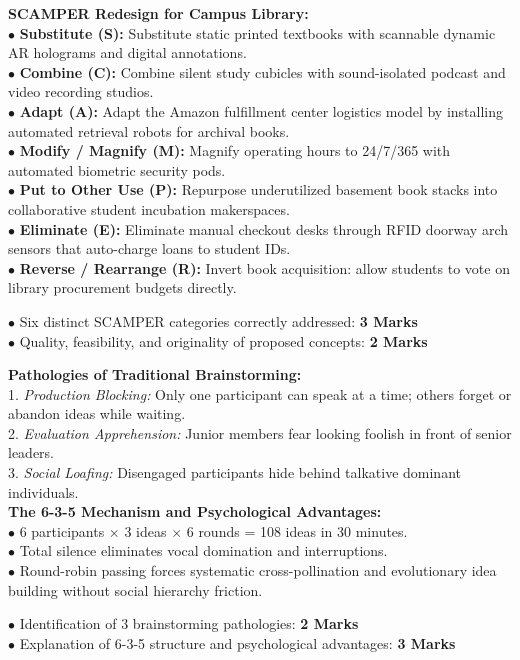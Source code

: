 \begin{solutionbox}
\textbf{SCAMPER Redesign for Campus Library:}\\
$\bullet$ \textbf{Substitute (S):} Substitute static printed textbooks with scannable dynamic AR holograms and digital annotations.\\
$\bullet$ \textbf{Combine (C):} Combine silent study cubicles with sound-isolated podcast and video recording studios.\\
$\bullet$ \textbf{Adapt (A):} Adapt the Amazon fulfillment center logistics model by installing automated retrieval robots for archival books.\\
$\bullet$ \textbf{Modify / Magnify (M):} Magnify operating hours to 24/7/365 with automated biometric security pods.\\
$\bullet$ \textbf{Put to Other Use (P):} Repurpose underutilized basement book stacks into collaborative student incubation makerspaces.\\
$\bullet$ \textbf{Eliminate (E):} Eliminate manual checkout desks through RFID doorway arch sensors that auto-charge loans to student IDs.\\
$\bullet$ \textbf{Reverse / Rearrange (R):} Invert book acquisition: allow students to vote on library procurement budgets directly.
\begin{markingrubric}
$\bullet$ Six distinct SCAMPER categories correctly addressed: \textbf{3 Marks}\\
$\bullet$ Quality, feasibility, and originality of proposed concepts: \textbf{2 Marks}
\end{markingrubric}
\end{solutionbox}

\begin{solutionbox}
\textbf{Pathologies of Traditional Brainstorming:}\\
1. \textit{Production Blocking:} Only one participant can speak at a time; others forget or abandon ideas while waiting.\\
2. \textit{Evaluation Apprehension:} Junior members fear looking foolish in front of senior leaders.\\
3. \textit{Social Loafing:} Disengaged participants hide behind talkative dominant individuals.\\
\textbf{The 6-3-5 Mechanism and Psychological Advantages:}\\
$\bullet$ 6 participants $\times$ 3 ideas $\times$ 6 rounds = 108 ideas in 30 minutes.\\
$\bullet$ Total silence eliminates vocal domination and interruptions.\\
$\bullet$ Round-robin passing forces systematic cross-pollination and evolutionary idea building without social hierarchy friction.
\begin{markingrubric}
$\bullet$ Identification of 3 brainstorming pathologies: \textbf{2 Marks}\\
$\bullet$ Explanation of 6-3-5 structure and psychological advantages: \textbf{3 Marks}
\end{markingrubric}
\end{solutionbox}

